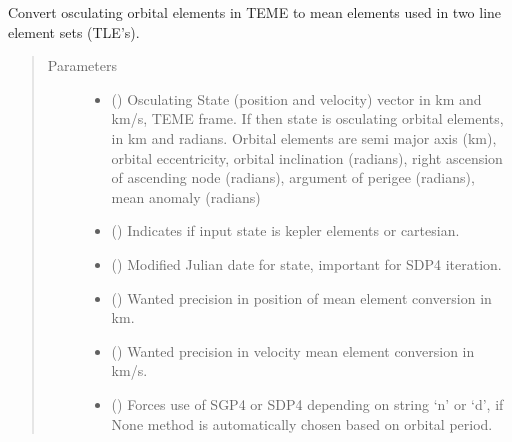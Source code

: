 \documentclass[letterpaper,10pt,english]{sphinxmanual}
\begin{document}

\begin{fulllineitems}
\label{\detokenize{modules/TLE_tools:TLE_tools.TEME_to_TLE_OPTIM}}
Convert osculating orbital elements in TEME
to mean elements used in two line element sets (TLE’s).
\begin{quote}\begin{description}
\item[{Parameters}] \leavevmode\begin{itemize}
\item {} 
 () \textendash{} Osculating State (position and velocity) vector in km and km/s, TEME frame. If  then state is osculating orbital elements, in km and radians. Orbital elements are semi major axis (km), orbital eccentricity, orbital inclination (radians), right ascension of ascending node (radians), argument of perigee (radians), mean anomaly (radians)

\item {} 
 () \textendash{} Indicates if input state is kepler elements or cartesian.

\item {} 
 () \textendash{} Modified Julian date for state, important for SDP4 iteration.

\item {} 
 () \textendash{} Wanted precision in position of mean element conversion in km.

\item {} 
 () \textendash{} Wanted precision in velocity mean element conversion in km/s.

\item {} 
 () \textendash{} Forces use of SGP4 or SDP4 depending on string ‘n’ or ‘d’, if None method is automatically chosen based on orbital period.


\end{itemize}
\end{description}
\end{quote}
\end{fulllineitems}
\end{document}
